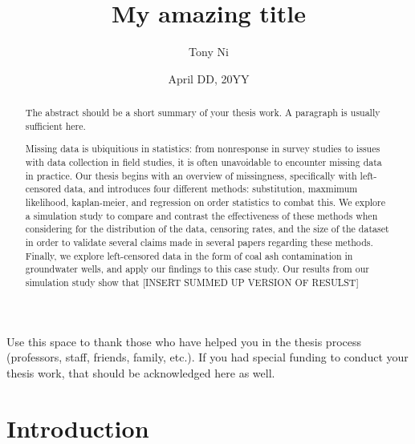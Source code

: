\documentclass[12pt, twoside]{amherstthesis}
\title{My amazing title}
\author{Tony Ni}
\date{April DD, 20YY}
\begin{document}
\doublespace
  \maketitle

\frontmatter %
\pagestyle{fancyplain}

  \begin{abstract}
    The abstract should be a short summary of your thesis work. A paragraph is usually sufficient here.

    Missing data is ubiquitious in statistics: from nonresponse in survey studies to issues with data collection in field studies, it is often unavoidable to encounter missing data in practice. Our thesis begins with an overview of missingness, specifically with left-censored data, and introduces four different methods: substitution, maxmimum likelihood, kaplan-meier, and regression on order statistics to combat this. We explore a simulation study to compare and contrast the effectiveness of these methods when considering for the distribution of the data, censoring rates, and the size of the dataset in order to validate several claims made in several papers regarding these methods. Finally, we explore left-censored data in the form of coal ash contamination in groundwater wells, and apply our findings to this case study. Our results from our simulation study show that {[}INSERT SUMMED UP VERSION OF RESULST{]}
  \end{abstract}
  \begin{acknowledgments}
    Use this space to thank those who have helped you in the thesis process (professors, staff, friends, family, etc.). If you had special funding to conduct your thesis work, that should be acknowledged here as well.
  \end{acknowledgments}

  \hypersetup{linkcolor=black}
  \setcounter{tocdepth}{2}
  \tableofcontents

  \listoftables

  \listoffigures


\mainmatter %
\pagestyle{fancyplain} %

\hypertarget{intro}{%
\chapter{Introduction}\label{intro}}
\end{document}
